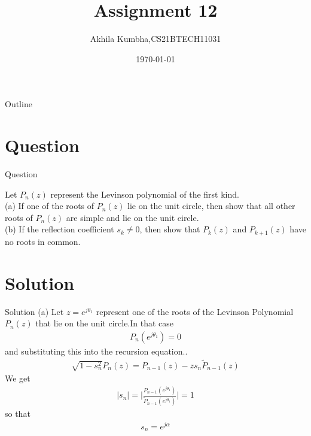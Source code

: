 \documentclass{beamer}
\title{Assignment 12}
\author{Akhila Kumbha,CS21BTECH11031}
\date{\today}
\providecommand{\brak}[1]{\ensuremath{\left(#1\right)}}
\begin{document}
\begin{frame}
    \titlepage 
\end{frame}

\logo{}

\begin{frame}{Outline}
    \tableofcontents
\end{frame}


\section{Question}
\begin{frame}{Question}

Let $P_n(z)$ represent the Levinson polynomial of the first kind. \\
(a) If one of the roots of $P_n(z)$ lie on the unit circle, then show that all other roots of $P_n(z)$ are simple and lie on the unit circle. \\
(b) If the reflection coefficient $s_k\neq0$, then show that $P_k(z)$ and $P_{k+1}(z)$ have no roots in common. 
\end{frame}


\section{Solution}
\begin{frame}{Solution}
(a) Let $z=e^{j\theta_1}$ represent one of the roots of the Levinson Polynomial $P_n(z)$ that lie on the unit circle.In that case
\begin{align}
    P_n\brak{e^{j\theta_1}} =0
\end{align}
and substituting this into the recursion equation..
\begin{align}
    \sqrt{1-s_n^2}P_n(z)=P_{n-1}(z)-z s_n\tilde{P}_{n-1}(z)
\end{align}We get
\begin{align}
    |s_n|=\bigg|\frac{P_{n-1}\brak{e^{j\theta_1}}}{\tilde{P}_{n-1}\brak{e^{j\theta_1}}} \bigg |=1
\end{align}
so that
\begin{align}
    s_n=e^{j\alpha}
\end{align}
\end{frame} 
\end{document}
